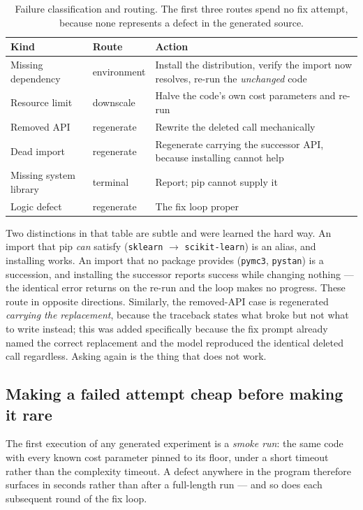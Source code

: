 \begin{table}[htbp]
\centering\small
\caption{Failure classification and routing. The first three routes spend no fix attempt,
because none represents a defect in the generated source.}
\label{tab:failures}
\begin{tabularx}{\textwidth}{llX}
\toprule
\textbf{Kind} & \textbf{Route} & \textbf{Action} \\
\midrule
Missing dependency & environment & Install the distribution, verify the import now resolves,
  re-run the \emph{unchanged} code \\
Resource limit & downscale & Halve the code's own cost parameters and re-run \\
Removed API & regenerate & Rewrite the deleted call mechanically \\
Dead import & regenerate & Regenerate carrying the successor API, because installing
  cannot help \\
Missing system library & terminal & Report; pip cannot supply it \\
Logic defect & regenerate & The fix loop proper \\
\bottomrule
\end{tabularx}
\end{table}

Two distinctions in that table are subtle and were learned the hard way. An import that pip
\emph{can} satisfy (\texttt{sklearn} $\rightarrow$ \texttt{scikit-learn}) is an alias, and
installing works. An import that no package provides (\texttt{pymc3}, \texttt{pystan}) is a
succession, and installing the successor reports success while changing nothing --- the
identical error returns on the re-run and the loop makes no progress. These route in opposite
directions. Similarly, the removed-API case is regenerated \emph{carrying the replacement},
because the traceback states what broke but not what to write instead; this was added
specifically because the fix prompt already named the correct replacement and the model
reproduced the identical deleted call regardless. Asking again is the thing that does not work.

\subsection{Making a failed attempt cheap before making it rare}

The first execution of any generated experiment is a \emph{smoke run}: the same code with every
known cost parameter pinned to its floor, under a short timeout rather than the complexity
timeout. A defect anywhere in the program therefore surfaces in seconds rather than after a
full-length run --- and so does each subsequent round of the fix loop.

